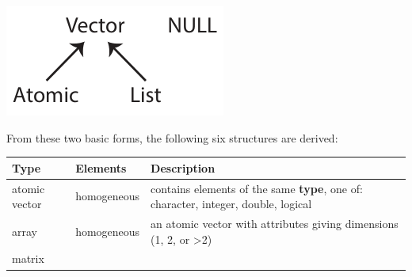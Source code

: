 \documentclass[
]{book}
\begin{document}
\includegraphics{R/RDataWrangling/images/summary_tree.png}

From these two basic forms, the following six structures are derived:

\begin{longtable}[]{@{}lll@{}}
\toprule
\begin{minipage}[b]{0.10\columnwidth}\raggedright
Type\strut
\end{minipage} & \begin{minipage}[b]{0.10\columnwidth}\raggedright
Elements\strut
\end{minipage} & \begin{minipage}[b]{0.71\columnwidth}\raggedright
Description\strut
\end{minipage}\tabularnewline
\midrule
\endhead
\begin{minipage}[t]{0.10\columnwidth}\raggedright
atomic vector\strut
\end{minipage} & \begin{minipage}[t]{0.10\columnwidth}\raggedright
homogeneous\strut
\end{minipage} & \begin{minipage}[t]{0.71\columnwidth}\raggedright
contains elements of the same \textbf{type}, one of: character, integer, double, logical\strut
\end{minipage}\tabularnewline
\begin{minipage}[t]{0.10\columnwidth}\raggedright
array\strut
\end{minipage} & \begin{minipage}[t]{0.10\columnwidth}\raggedright
homogeneous\strut
\end{minipage} & \begin{minipage}[t]{0.71\columnwidth}\raggedright
an atomic vector with attributes giving dimensions (1, 2, or \textgreater2)\strut
\end{minipage}\tabularnewline
\begin{minipage}[t]{0.10\columnwidth}\raggedright
matrix\strut
\end{minipage} & \begin{minipage}[t]{0.10\columnwidth}\raggedright

\end{minipage}
\end{longtable}
\end{document}
